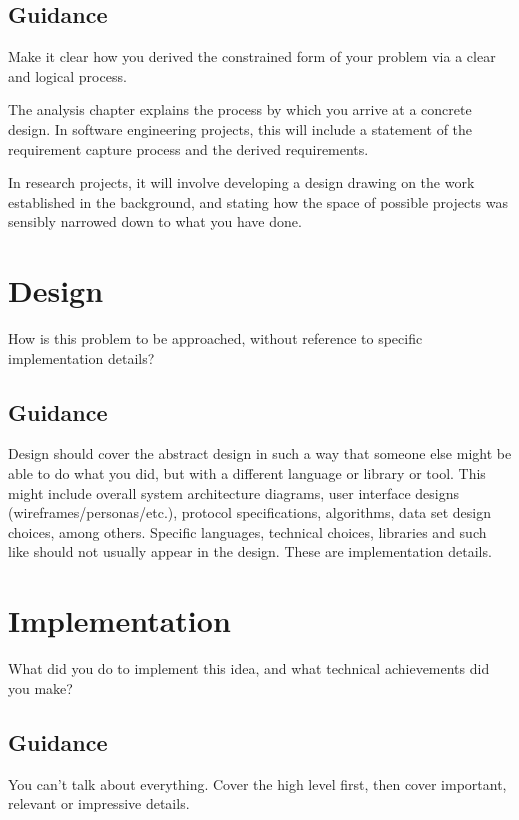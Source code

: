 \documentclass{l4proj}
\begin{document}
\section{Guidance}
Make it clear how you derived the constrained form of your problem via a clear and logical process. 

The analysis chapter explains the process by which you arrive at a concrete design. In software 
engineering projects, this will include a statement of the requirement capture process and the
derived requirements.

In research projects, it will involve developing a design drawing on
the work established in the background, and stating how the space of possible projects was
sensibly narrowed down to what you have done.

\chapter{Design}
How is this problem to be approached, without reference to specific implementation details? 
\section{Guidance}
Design should cover the abstract design in such a way that someone else might be able to do what you did, 
but with a different language or library or tool. This might include overall system architecture diagrams,
user interface designs (wireframes/personas/etc.), protocol specifications, algorithms, data set design choices,
among others. Specific languages, technical choices, libraries and such like should not usually appear in the design. These are implementation details.


\chapter{Implementation}
What did you do to implement this idea, and what technical achievements did you make?
\section{Guidance}
You can't talk about everything. Cover the high level first, then cover important, relevant or impressive details.
\end{document}
